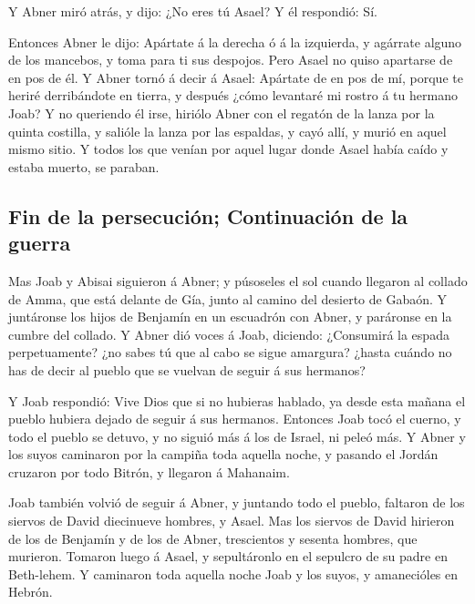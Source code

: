  Y Abner miró atrás, y dijo: ¿No eres tú Asael? Y él
respondió: Sí.

 Entonces Abner le dijo: Apártate á la derecha ó á la
izquierda, y agárrate alguno de los mancebos, y toma para ti sus
despojos. Pero Asael no quiso apartarse de en pos de él. 
Y Abner tornó á decir á Asael: Apártate de en pos de mí, porque te
heriré derribándote en tierra, y después ¿cómo levantaré mi rostro á tu
hermano Joab?  Y no queriendo él irse, hiriólo Abner con
el regatón de la lanza por la quinta costilla, y salióle la lanza por
las espaldas, y cayó allí, y murió en aquel mismo sitio. Y todos los que
venían por aquel lugar donde Asael había caído y estaba muerto, se
paraban.

\hypertarget{fin-de-la-persecuciuxf3n-continuaciuxf3n-de-la-guerra}{%
\subsection{Fin de la persecución; Continuación de la
guerra}\label{fin-de-la-persecuciuxf3n-continuaciuxf3n-de-la-guerra}}

 Mas Joab y Abisai siguieron á Abner; y púsoseles el sol
cuando llegaron al collado de Amma, que está delante de Gía, junto al
camino del desierto de Gabaón.  Y juntáronse los hijos de
Benjamín en un escuadrón con Abner, y paráronse en la cumbre del
collado.  Y Abner dió voces á Joab, diciendo: ¿Consumirá
la espada perpetuamente? ¿no sabes tú que al cabo se sigue amargura?
¿hasta cuándo no has de decir al pueblo que se vuelvan de seguir á sus
hermanos?

 Y Joab respondió: Vive Dios que si no hubieras hablado,
ya desde esta mañana el pueblo hubiera dejado de seguir á sus hermanos.
 Entonces Joab tocó el cuerno, y todo el pueblo se
detuvo, y no siguió más á los de Israel, ni peleó más.  Y
Abner y los suyos caminaron por la campiña toda aquella noche, y pasando
el Jordán cruzaron por todo Bitrón, y llegaron á Mahanaim.

 Joab también volvió de seguir á Abner, y juntando todo
el pueblo, faltaron de los siervos de David diecinueve hombres, y Asael.
 Mas los siervos de David hirieron de los de Benjamín y
de los de Abner, trescientos y sesenta hombres, que murieron. Tomaron
luego á Asael, y sepultáronlo en el sepulcro de su padre en Beth-lehem.
 Y caminaron toda aquella noche Joab y los suyos, y
amanecióles en Hebrón.

